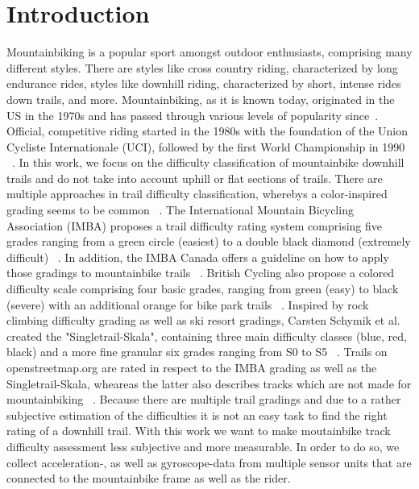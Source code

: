 \documentclass[runningheads]{llncs}
\begin{document}
\section{Introduction}
Mountainbiking is a popular sport amongst outdoor enthusiasts, comprising many different styles.
There are styles like cross country riding, characterized by long endurance rides, styles like downhill riding, characterized by short, intense rides down trails, and more.
Mountainbiking, as it is known today, originated in the US in the 1970s and has passed through various levels of popularity since~\cite{gaulrapp2001injuries}.
Official, competitive riding started in the 1980s with the foundation of the Union Cycliste Internationale (UCI), followed by the first World Championship in 1990 ~\cite{impellizzeri2007physiology}. 
In this work, we focus on the difficulty classification of mountainbike downhill trails and do not take into account uphill or flat sections of trails.
There are multiple approaches in trail difficulty classification, wherebys a color-inspired grading seems to be common ~\cite{imbarating,britishcyclinggrades,schymik2008singletrail}.
The International Mountain Bicycling Association (IMBA) proposes a trail difficulty rating system comprising five grades ranging from a green circle (easiest) to a double black diamond (extremely difficult) ~\cite{imbarating}. 
In addition, the IMBA Canada offers a guideline on how to apply those gradings to mountainbike trails ~\cite{imbaguidelines}.
British Cycling also propose a colored difficulty scale comprising four basic grades, ranging from green (easy) to black (severe) with an additional orange for bike park trails ~\cite{britishcyclinggrades}.
Inspired by  rock climbing difficulty grading as well as ski resort gradings, Carsten Schymik et al. created the "Singletrail-Skala", containing three main difficulty classes (blue, red, black) and a more fine granular six grades ranging from S0 to S5 ~\cite{schymik2008singletrail}. 
Trails on openstreetmap.org are rated in respect to the IMBA grading as well as the Singletrail-Skala, wheareas the latter also describes tracks which are not made for mountainbiking ~\cite{osmsingletrails}. 
Because there are multiple trail gradings and due to a rather subjective estimation of the difficulties it is not an easy task to find the right rating of a downhill trail.
With this work we want to make moutainbike track difficulty assessment less subjective and more measurable.
In order to do so, we collect acceleration-, as well as gyroscope-data from multiple sensor units that are connected to the mountainbike frame as well as the rider.
\end{document}
